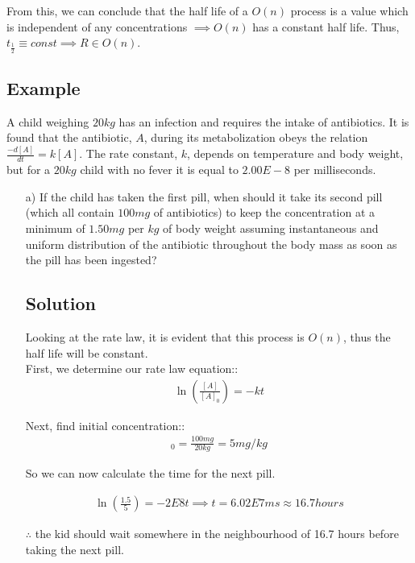 \documentclass[12pt]{book}
\begin{document}
From this, we can conclude that the half life of a $O(n)$ process is a value which is independent of any concentrations $\implies O(n)$ has a constant half life. Thus, $t_{\frac{1}{2}}\equiv const\implies R\in O(n)$.

\subsection*{Example}

A child weighing $20 kg$ has an infection and requires the intake of antibiotics. It is found that
the antibiotic, $A$, during its metabolization obeys the relation $\frac{-d[A]}{dt}=k[A]$. The rate
constant, $k$, depends on temperature and body weight, but for a $20 kg$ child with no fever it
is equal to $2.00E-8$ per milliseconds.

\begin{itemize}
    \item[a)] If the child has taken the first pill, when should it take its second pill (which all contain $100 mg$ of antibiotics) to keep the concentration at a minimum of $1.50 mg$ per $kg$ of body weight assuming instantaneous and uniform distribution of the antibiotic throughout the
    body mass as soon as the pill has been ingested?

    \subsection*{Solution}
    Looking at the rate law, it is evident that this process is $O(n)$, thus the half life will be constant.\\
    First, we determine our rate law equation::
    \begin{align}
        \ln\left(\frac{[A]}{[A]_0}\right)=-kt
    \end{align}

    Next, find initial concentration::
    \begin{align}
        [A]_0=\frac{100mg}{20kg}=5 mg/kg
    \end{align}

    So we can now calculate the time for the next pill.

    \begin{align}
        \ln\left(\frac{1.5}{5}\right)=-2E8t\implies t=6.02E7 ms\approx 16.7 hours
    \end{align}

    $\therefore$ the kid should wait somewhere in the neighbourhood of 16.7 hours before taking the next pill.


\end{itemize}
\end{document}
